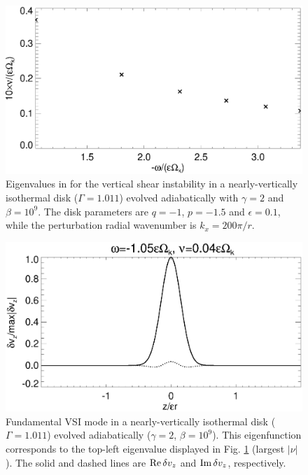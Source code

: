 \begin{figure}
  \includegraphics[width=\linewidth]{figures/eigenvalues_adia}
  \caption{Eigenvalues in for the
    vertical shear instability in a nearly-vertically isothermal disk
    ($\Gamma=1.011$) evolved adiabatically with $\gamma=2$ and
    $\beta=10^9$. The disk
    parameters are $q=-1$, 
    $p=-1.5$ and $\epsilon=0.1$, while the perturbation radial
    wavenumber is $k_x=200\pi/r$. \label{lowfreq_eigen_adia}
  }
\end{figure}
  

\begin{figure}
  \includegraphics[width=\linewidth]{figures/eigenvectorvz_adia}
  \caption{Fundamental VSI mode in a nearly-vertically
    isothermal disk ($\Gamma=1.011$) evolved adiabatically
    ($\gamma=2$, $\beta=10^9$). This eigenfunction 
    corresponds to the top-left eigenvalue displayed in 
    Fig. \ref{lowfreq_eigen_adia} (largest $|\nu|$).  
    The solid and dashed lines are $\operatorname{Re} \delta v_z$ and $\operatorname{Im}
    \delta v_z$, respectively.  
    \label{lowfreq_eigenfunc_adia}
  }
\end{figure}



